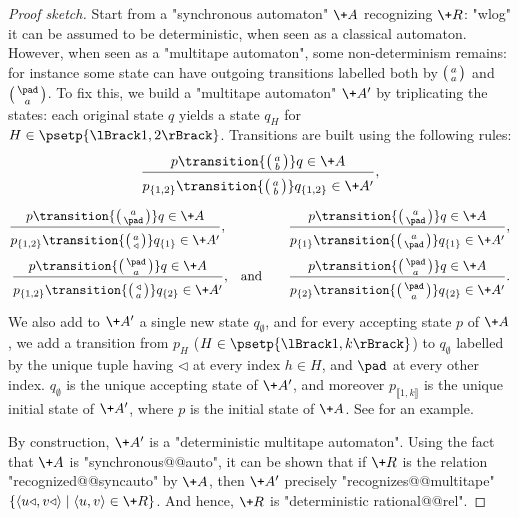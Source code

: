 \begin{proof}[Proof sketch]
	Start from a "synchronous automaton" $\+A$ recognizing $\+R$:
	"wlog" it can be assumed to be deterministic, when seen 
	as a classical automaton. However, when seen as a "multitape automaton", some non-determinism 
	remains: for instance some state can have outgoing transitions labelled both
	by $\pair{a}{a}$ and $\pair{\pad}{a}$.
	To fix this, we build a "multitape automaton" $\+A'$ by triplicating the states:
	each original state $q$ yields a state $q_H$ for $H \in \psetp{\lBrack 1,2 \rBrack}$.
	Transitions are built using the following rules:
	\[
		\frac{
			p \transition{\pair{a}{b}} q \in \+A
		}{
			p_{\{1,2\}} \transition{\pair{a}{b}} q_{\{1,2\}} \in \+A'
			\vphantom{\Big()}
		},
	\]
	\vspace{-2em}
	\begin{align*}
		\frac{
			p \transition{\pair{a}{\pad}} q \in \+A
		}{
			p_{\{1,2\}} \transition{\pair{a}{\triangleleft}} q_{\{1\}} \in \+A'
			\vphantom{\Big()}
		},\hphantom{\quad and}\qquad
		& 
		\frac{
			p \transition{\pair{a}{\pad}} q \in \+A	
		}{
			p_{\{1\}} \transition{\pair{a}{\pad}} q_{\{1\}} \in \+A'
			\vphantom{\Big()}
		}, \\
		\frac{
			p \transition{\pair{\pad}{a}} q \in \+A
		}{
			p_{\{1,2\}} \transition{\pair{\triangleleft}{a}} q_{\{2\}} \in \+A'
			\vphantom{\Big()}
		}\text{,\quad and}\qquad
		& 
		\frac{
			p \transition{\pair{\pad}{a}} q \in \+A
		}{
			p_{\{2\}} \transition{\pair{\pad}{a}} q_{\{2\}} \in \+A'
			\vphantom{\Big()}
		}.\\
	\end{align*}
	We also add to $\+A'$ a single new state $q_{\emptyset}$, and for every accepting state $p$ of
	$\+A$, we add a transition from $p_H$ ($H \in \psetp{\lBrack 1,k\rBrack}$) to $q_{\emptyset}$
	labelled by the unique tuple having $\triangleleft$ at every index $h \in H$,
	and $\pad$ at every other index.
	$q_{\emptyset}$ is the unique accepting state of $\+A'$, and moreover
	$p_{\lBrack 1,k\rBrack}$ is the unique initial state of $\+A'$, where $p$ is the initial state of $\+A$. See  for an example.
	
	By construction, $\+A'$ is a "deterministic multitape automaton". 
	Using the fact that $\+A$ is "synchronous@@auto", it can be shown that
	if $\+R$ is the relation "recognized@@syncauto" by $\+A$, then $\+A'$ precisely 
	"recognizes@@multitape" $\{\tup{u\triangleleft,v\triangleleft} \mid \tup{u,v} \in \+R\}$.
	And hence, $\+R$ is "deterministic rational@@rel".
\end{proof}

